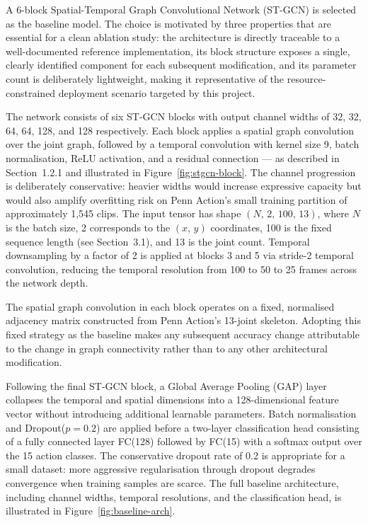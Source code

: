 A 6-block Spatial-Temporal Graph Convolutional Network (ST-GCN) is selected as the baseline model. The choice is motivated by three properties that are essential for a clean ablation study: the architecture is directly traceable to a well-documented reference implementation, its block structure exposes a single, clearly identified component for each subsequent modification, and its parameter count is deliberately lightweight, making it representative of the resource-constrained deployment scenario targeted by this project. 

The network consists of six ST-GCN blocks with output channel widths of 32, 32, 64, 64, 128, and 128 respectively. Each block applies a spatial graph convolution over the joint graph, followed by a temporal convolution with kernel size 9, batch normalisation, ReLU activation, and a residual connection --- as described in Section~1.2.1 and illustrated in Figure~\ref{fig:stgcn-block}. The channel progression is deliberately conservative: heavier widths would increase expressive capacity but would also amplify overfitting risk on Penn Action's small training partition of approximately 1,545 clips. The input tensor has shape $(N,\,2,\,100,\,13)$, where $N$ is the batch size, 2 corresponds to the $(x,\,y)$ coordinates, 100 is the fixed sequence length (see Section~3.1), and 13 is the joint count. Temporal downsampling by a factor of 2 is applied at blocks 3 and 5 via stride-2 temporal convolution, reducing the temporal resolution from 100 to 50 to 25 frames across the network depth.

The spatial graph convolution in each block operates on a fixed, normalised adjacency matrix constructed from Penn Action's 13-joint skeleton. Adopting this fixed strategy as the baseline makes any subsequent accuracy change attributable to the change in graph connectivity rather than to any other architectural modification.

Following the final ST-GCN block, a Global Average Pooling (GAP) layer collapses the temporal and spatial dimensions into a 128-dimensional feature vector without introducing additional learnable parameters. Batch normalisation and Dropout($p = 0.2$) are applied before a two-layer classification head consisting of a fully connected layer FC(128) followed by FC(15) with a softmax output over the 15 action classes. The conservative dropout rate of 0.2 is appropriate for a small dataset: more aggressive regularisation through dropout degrades convergence when training samples are scarce. The full baseline architecture, including channel widths, temporal resolutions, and the classification head, is illustrated in Figure~\ref{fig:baseline-arch}.

